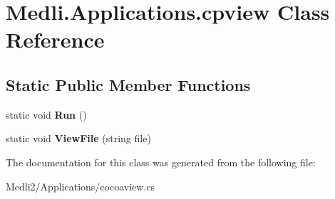 \hypertarget{class_medli_1_1_applications_1_1cpview}{}\section{Medli.\+Applications.\+cpview Class Reference}
\label{class_medli_1_1_applications_1_1cpview}
\subsection*{Static Public Member Functions}
\begin{DoxyCompactItemize}
\item 
\mbox{\label{class_medli_1_1_applications_1_1cpview_a4fede002eab730af93f606cdd10988f6}} 
static void {\bfseries Run} ()
\item 
\mbox{\label{class_medli_1_1_applications_1_1cpview_aa0fe39664496e423100949c994f37ca9}} 
static void {\bfseries View\+File} (string file)
\end{DoxyCompactItemize}


The documentation for this class was generated from the following file\+:\begin{DoxyCompactItemize}
\item 
Medli2/\+Applications/cocoaview.\+cs\end{DoxyCompactItemize}
